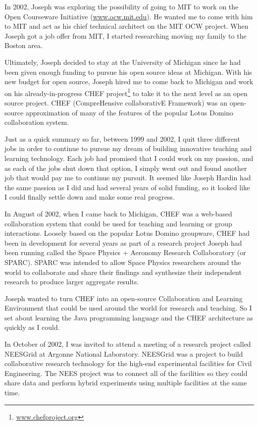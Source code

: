 \documentclass[12pt]{book}
\begin{document}
In 2002, Joseph was exploring the possibility of going to MIT to work on the
Open Courseware Initiative (\url{www.ocw.mit.edu}).  He wanted me to
come with him to MIT and act as his chief technical architect on
the MIT OCW project.  When Joseph got a job offer from MIT, I started
researching moving my family to the Boston area.

Ultimately, Joseph decided to stay at the University of Michigan
since he had been given enough funding to pursue his
open source ideas at Michigan.  With his new budget for open source,
Joseph hired me to come back to Michigan
and work on his already-in-progress CHEF project\footnote{\url{www.chefproject.org}}
to take it to the next level as an open source project.
CHEF (CompreHensive collaborativE Framework)
was an open-source approximation of many of the features of
the popular Lotus Domino collaboration system.

Just as a quick summary so far, between 1999 and 2002,
I quit three different jobs in order to continue to
pursue my dream of building innovative teaching and learning
technology.  Each job had promised that I could work
on my passion, and as each of the jobs shut down that
option, I simply went out and found another
job that would pay me to continue my pursuit.  It seemed like
Joseph Hardin had the same passion as I did and had several
years of solid funding, so it looked like I could finally
settle down and make some real progress.

In August of 2002, when I came back to Michigan, CHEF was a web-based
collaboration system that could be used for teaching and learning
or group interactions.  Loosely based
on the popular Lotus Domino groupware,
CHEF had been in development for several years as part of
a research project Joseph had been running called the
Space Physics + Aeronomy Research Collaboratory (or SPARC).
SPARC was intended to allow Space Physics researchers around the
world to collaborate and share their findings and synthesize their
independent research to produce larger aggregate results.

Joseph wanted to turn CHEF into an open-source Collaboration and
Learning Environment that could be used around the world for research
and teaching.  So I set about learning the Java programming language
and the CHEF architecture as quickly as I could.

In October of 2002, I was invited to attend a meeting of a research
project called NEESGrid at Argonne National Laboratory.  NEESGrid
was a project to build collaborative
research technology for the high-end experimental facilities for Civil
Engineering.  The NEES project was to connect all of the facilities
so they could share data and perform hybrid experiments using multiple
facilities at the same time.
\end{document}
